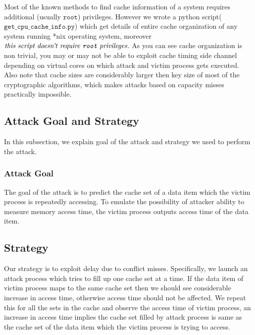 \documentclass[twocolumn]{IEEEtran}
\begin{document}
Most of the known methods to find cache information of a system requires additional (usually $\texttt{root}$) privileges. However we wrote a python script($\texttt{get\_cpu\_cache\_info.py}$) which get details of entire cache organization of any system running *nix operating system, moreover $\textit{this script doesn't require \texttt{root} privileges}$. As you can see cache organization is non trivial, you may or may not be able to exploit cache timing side channel depending on virtual cores on which attack and victim process gets executed. Also note that cache sizes are considerably larger then key size of most of the cryptographic algorithms, which makes attacks based on capacity misses practically impossible.
\subsection {Attack Goal and Strategy}
In this subsection, we explain goal of the attack and strategy we used to perform the attack.
\subsubsection {Attack Goal}
The goal of the attack is to predict the cache set of a data item which the victim process is repeatedly accessing. To emulate the possibility of attacker ability to measure memory access time, the victim process outputs access time of the data item.
\subsection {Strategy}
Our strategy is to exploit delay due to conflict misses. Specifically, we launch an attack process which tries to fill up one cache set at a time. If the data item of victim process maps to the same cache set then we should see considerable increase in access time, otherwise access time should not be affected. We repeat this for all the sets in the cache and observe the access time of victim process, an increase in access time implies the cache set filled by attack process is same as the cache set of the data item which the victim process is trying to access.
\end{document}
